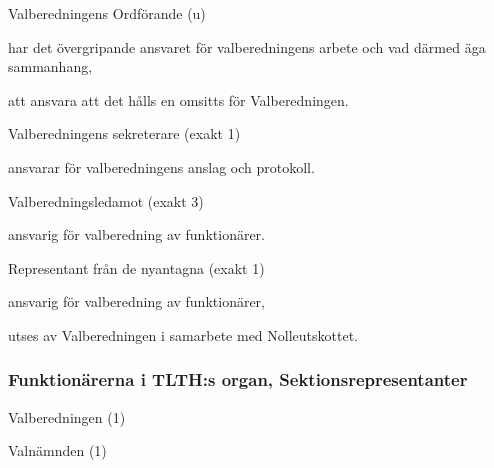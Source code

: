\documentclass[10pt]{article}
\begin{document}
\begin{emptylist}
    \item Valberedningens Ordförande (u)
        \begin{dashlist}
            \item har det övergripande ansvaret för valberedningens arbete
                och vad därmed äga sammanhang,
            \item att ansvara att det hålls en omsitts för Valberedningen.
        \end{dashlist}
    \item Valberedningens sekreterare (exakt 1)
        \begin{dashlist}
            \item ansvarar för valberedningens anslag och protokoll.
        \end{dashlist}
    \item Valberedningsledamot (exakt 3)
        \begin{dashlist}
            \item ansvarig för valberedning av funktionärer.
        \end{dashlist}
    \item Representant från de nyantagna (exakt 1)
        \begin{dashlist}
            \item ansvarig för valberedning av funktionärer,
            \item utses av Valberedningen i samarbete med Nolleutskottet.
        \end{dashlist}
\end{emptylist}

\subsubsection{Funktionärerna i TLTH:s organ, Sektionsrepresentanter}
\begin{emptylist}
    \item Valberedningen (1)
    \item Valnämnden (1)
\end{emptylist}
\end{document}
